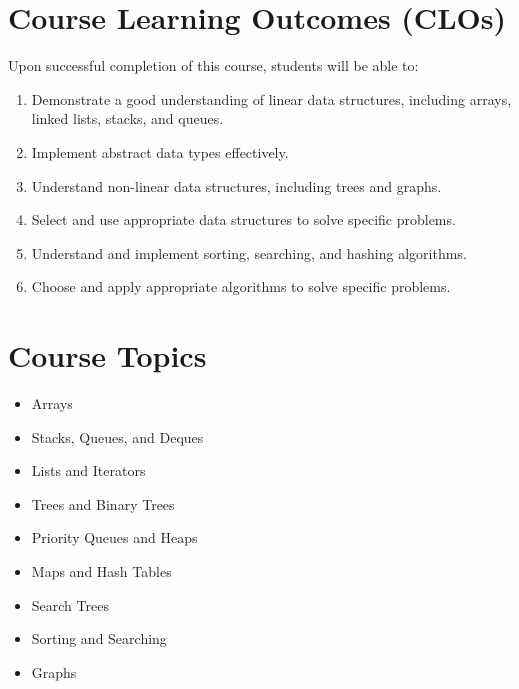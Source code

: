 \documentclass[11pt,a4paper]{article}
\begin{document}
\section*{Course Learning Outcomes (CLOs)}
Upon successful completion of this course, students will be able to:
\begin{enumerate}
  \item Demonstrate a good understanding of linear data structures, including
        arrays, linked lists, stacks, and queues.
  \item Implement abstract data types effectively.
  \item Understand non-linear data structures, including trees and graphs.
  \item Select and use appropriate data structures to solve specific problems.
  \item Understand and implement sorting, searching, and hashing algorithms.
  \item Choose and apply appropriate algorithms to solve specific problems.
\end{enumerate}

\section*{Course Topics}
\begin{itemize}
  \item Arrays
  \item Stacks, Queues, and Deques
  \item Lists and Iterators
  \item Trees and Binary Trees
  \item Priority Queues and Heaps
  \item Maps and Hash Tables
  \item Search Trees
  \item Sorting and Searching
  \item Graphs
\end{itemize}
\end{document}
